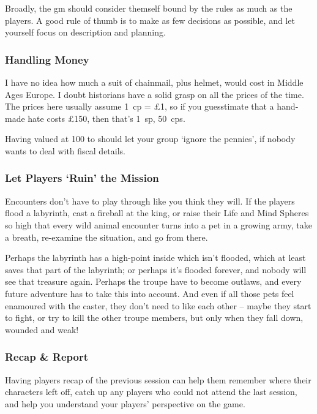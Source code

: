 \begin{multicols}{2}
Broadly, the \gls{gm} should consider themself bound by the rules as much as the players.
A good rule of thumb is to make as few decisions as possible, and let yourself focus on description and planning.

\subsubsection{Handling Money}
I have no idea how much a suit of chainmail, plus helmet, would cost in Middle Ages Europe.
I doubt historians have a solid grasp on all the prices of the time.
The prices here usually assume 1~\gls{cp} = \pounds1, so if you guesstimate that a hand-made hate costs \pounds150, then that's 1~\gls{sp}, 50~\glspl{cp}.

Having  valued at 100 to  should let your group `ignore the pennies', if nobody wants to deal with fiscal details.

\subsubsection{Let Players `Ruin' the Mission}

Encounters don't have to play through like you think they will.
If the players flood a labyrinth, cast a fireball at the king, or raise their Life and Mind Spheres so high that every wild animal encounter turns into a pet in a growing army, take a breath, re-examine the situation, and go from there.

Perhaps the labyrinth has a high-point inside which isn't flooded, which at least saves that part of the labyrinth; or perhaps it's flooded forever, and nobody will see that treasure again.
Perhaps the troupe have to become outlaws, and every future adventure has to take this into account.
And even if all those pets feel enamoured with the caster, they don't need to like each other -- maybe they start to fight, or try to kill the other troupe members, but only when they fall down, wounded and weak!

\subsubsection{Recap \& Report}

Having players recap of the previous session can help them remember where their characters left off, catch up any players who could not attend the last session, and help you understand your players' perspective on the game.


\end{multicols}
